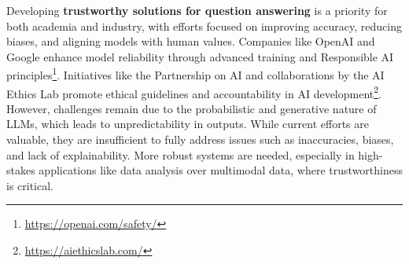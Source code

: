 Developing \textbf{trustworthy solutions for question answering} is a priority for both academia and industry, with efforts focused on improving accuracy, reducing biases, and aligning models with human values. Companies like OpenAI and Google enhance model reliability through advanced training and Responsible AI principles\footnote{\url{https://openai.com/safety/}}. Initiatives like the Partnership on AI and collaborations by the AI Ethics Lab promote ethical guidelines and accountability in AI development\footnote{\url{https://aiethicslab.com/}}. However, challenges remain due to the probabilistic and generative nature of LLMs, which leads to unpredictability in outputs. While current efforts are valuable, they are insufficient to fully address issues such as inaccuracies, biases, and lack of explainability. More robust systems are needed, especially in high-stakes applications like data analysis over multimodal data, where trustworthiness is critical.




